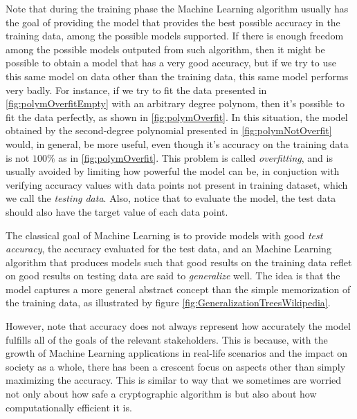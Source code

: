 Note that during the training phase the Machine Learning algorithm usually has the goal of providing the model that provides the best possible accuracy in the training data, among the possible models supported. If there is enough freedom among the possible models outputed from such algorithm, then it might be possible to obtain a model that has a very good accuracy, but if we try to use this same model on data other than the training data, this same model performs very badly. For instance, if we try to fit the data presented in \ref{fig:polymOverfitEmpty} with an arbitrary degree polynom, then it's possible to fit the data perfectly, as shown in \ref{fig:polymOverfit}. In this situation, the model obtained by the second-degree polynomial presented in \ref{fig:polymNotOverfit} would, in general, be more useful, even though it's accuracy on the training data is not $100\%$ as in \ref{fig:polymOverfit}. This problem is called \emph{overfitting}, and is usually avoided by limiting how powerful the model can be, in conjuction with verifying accuracy values with data points not present in training dataset, which we call the \emph{testing data}. Also, notice that to evaluate the model, the test data should also have the target value of each data point.


The classical goal of Machine Learning is to provide models with good \emph{test accuracy}, the accuracy evaluated for the test data, and an Machine Learning algorithm that produces models such that good results on the training data reflet on good results on testing data are said to \emph{generalize} well. The idea is that the model captures a more general abstract concept than the simple memorization of the training data, as illustrated by figure \ref{fig:GeneralizationTreesWikipedia}. 

However, note that accuracy does not always represent how accurately the model fulfills all of the goals of the relevant stakeholders. This is because, with the growth of Machine Learning applications in real-life scenarios and the impact on society as a whole, there has been a crescent focus on aspects other than simply maximizing the accuracy. This is similar to way that we sometimes are worried not only about how safe a cryptographic algorithm is but also about how computationally efficient it is. 

